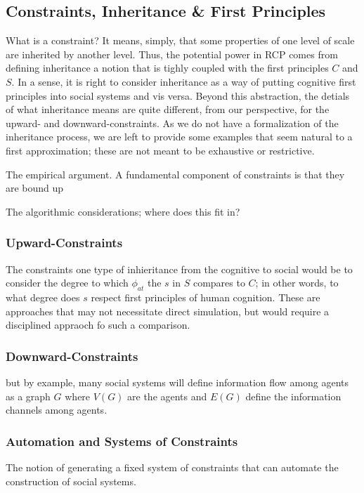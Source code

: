 \documentclass{article}
\begin{document}
\subsection{Constraints, Inheritance \& First Principles}
What is a constraint?  It means, simply, that some properties of one level of scale are inherited by another level.  Thus, the potential power in RCP comes from defining inheritance a notion that is tighly coupled with the first principles $C$ and $S$. In a sense, it is right to consider inheritance as a way of putting cognitive first principles into social systems and vis versa. Beyond this abstraction, the detials of what inheritance means are quite different, from our perspective, for the upward- and downward-constraints.  As we do not have a formalization of the inheritance process, we are left to provide some examples that seem natural to a first approximation; these are not meant to be exhaustive or restrictive.
 
The empirical argument.  A fundamental component of constraints is that they are bound up

The algorithmic considerations; where does this fit in?

\subsubsection{Upward-Constraints}
The constraints one type of inhieritance from the cognitive to social would be to consider the degree to which $\phi_{at}$ the $s$ in $S$ compares to $C$; in other words, to what degree does $s$ respect first principles of human cognition.  These are approaches that may not necessitate direct simulation, but would require a disciplined appraoch fo such a comparison. 

\subsubsection{Downward-Constraints}
but by example, many social systems will define information flow among agents as a graph $G$ where $V(G)$ are the agents and $E(G)$ define the information channels among agents. 


\subsubsection{Automation and Systems of Constraints}
The notion of generating a fixed system of constraints that can automate the construction of social systems.
\end{document}
